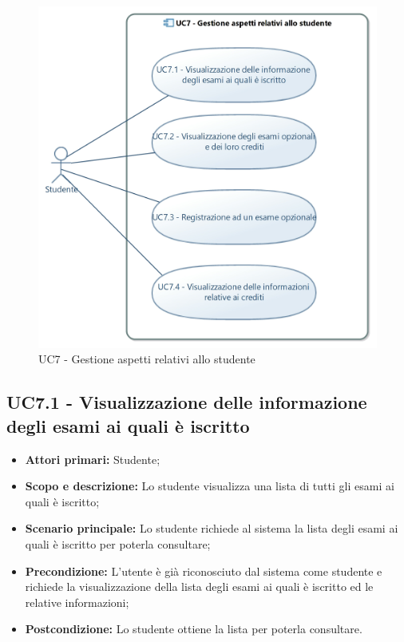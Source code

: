 \documentclass[AnalisiDeiRequisiti.tex]{subfiles}
\begin{document}
\begin{figure}[H]
	\centering
	\includegraphics[width=0.8\linewidth]{UC7.jpg}
	\caption{UC7 - Gestione aspetti relativi allo studente}
	\label{fig:UC7 - Gestione aspetti relativi allo studente}
\end{figure}


\subsection{UC7.1 - Visualizzazione delle informazione degli esami ai quali è iscritto}
\begin{itemize}
	\item \textbf{Attori primari:} Studente;\\
	\item \textbf{Scopo e descrizione:} Lo studente visualizza una lista di tutti gli esami ai quali è iscritto;\\
	\item \textbf{Scenario principale:} Lo studente richiede al sistema la lista degli esami ai quali è iscritto per poterla consultare;\\
	\item \textbf{Precondizione:} L'utente è già riconosciuto dal sistema come studente e richiede la visualizzazione della lista degli esami ai quali è iscritto ed le relative informazioni;\\
	\item \textbf{Postcondizione:} Lo studente ottiene la lista per poterla consultare.\\
\end{itemize}
\end{document}
